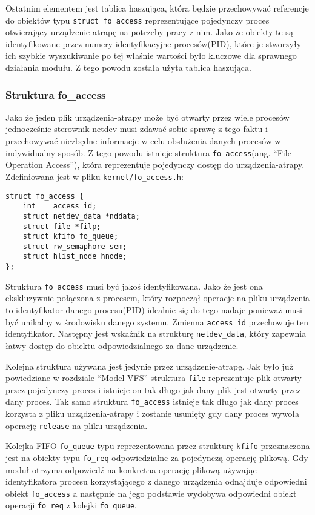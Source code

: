 \documentclass[10pt]{article}
\begin{document}
Ostatnim elementem jest tablica haszująca, która będzie przechowywać referencje do obiektów typu \texttt{struct fo\_access} reprezentujące pojedynczy proces otwierający urządzenie-atrapę na potrzeby pracy z nim.  Jako że obiekty te są identyfikowane przez numery identyfikacyjne procesów(PID), które je stworzyły ich szybkie wyszukiwanie po tej właśnie wartości było kluczowe dla sprawnego działania modułu. Z tego powodu została użyta tablica haszująca.

\subsubsection{Struktura fo\_access}

Jako że jeden plik urządzenia-atrapy może być otwarty przez wiele procesów jednocześnie sterownik netdev musi zdawać sobie sprawę z tego faktu i przechowywać niezbędne informacje w celu obsłużenia danych procesów w indywidualny sposób. Z tego powodu istnieje struktura \texttt{fo\_access}(ang. ``File Operation Access''), która reprezentuje pojedynczy dostęp do urządzenia-atrapy. Zdefiniowana jest w pliku \texttt{kernel/fo\_access.h}:

\begin{verbatim}
struct fo_access {
    int    access_id;
    struct netdev_data *nddata;
    struct file *filp;
    struct kfifo fo_queue;
    struct rw_semaphore sem;
    struct hlist_node hnode;
};
\end{verbatim}

Struktura \texttt{fo\_access} musi być jakoś identyfikowana. Jako że jest ona ekskluzywnie połączona z procesem, który rozpoczął operacje na pliku urządzenia to identyfikator danego procesu(PID) idealnie się do tego nadaje ponieważ musi być unikalny w środowisku danego systemu.  Zmienna \texttt{access\_id} przechowuje ten identyfikator. Następny jest wskaźnik na strukturę \texttt{netdev\_data}, który zapewnia łatwy dostęp do obiektu odpowiedzialnego za dane urządzenie.

Kolejna struktura używana jest jedynie przez urządzenie-atrapę. Jak było już powiedziane w rozdziale ``\hyperref[model-vfs]{Model VFS}'' struktura \texttt{file} reprezentuje plik otwarty przez pojedynczy proces i istnieje on tak długo jak dany plik jest otwarty przez dany proces. Tak samo struktura \texttt{fo\_access} istnieje tak długo jak dany proces korzysta z pliku urządzenia-atrapy i zostanie usunięty gdy dany proces wywoła operację \texttt{release} na pliku urządzenia.

Kolejka FIFO \texttt{fo\_queue} typu reprezentowana przez strukturę \texttt{kfifo} przeznaczona jest na obiekty typu \texttt{fo\_req} odpowiedzialne za pojedynczą operację plikową. Gdy moduł otrzyma odpowiedź na konkretna operację plikową używając identyfikatora procesu korzystającego z danego urządzenia odnajduje odpowiedni obiekt \texttt{fo\_access} a następnie na jego podstawie wydobywa odpowiedni obiekt operacji \texttt{fo\_req} z kolejki \texttt{fo\_queue}.
\end{document}

